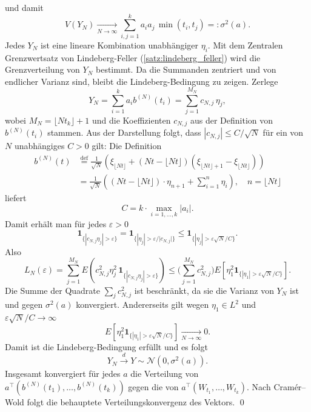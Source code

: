 \begin{satz}
$$$$
und damit
$$
V(Y_N)\xrightarrow[N\to\infty]{}\sum_{i,j=1}^k a_i a_j\,\min(t_i,t_j)=:\sigma^2(a).
$$
Jedes $Y_N$ ist eine lineare Kombination unabhängiger $\eta_i$. Mit dem Zentralen Grenzwertsatz von Lindeberg-Feller (\ref{satz:lindeberg_feller}) wird die Grenzverteilung von $Y_N$ bestimmt.
Da die Summanden zentriert und von endlicher Varianz sind, bleibt die Lindeberg-Bedingung zu zeigen. Zerlege
$$
Y_N=\sum_{i=1}^k a_i b^{(N)}(t_i)=\sum_{j=1}^{M_N} c_{N,j}\,\eta_j,
$$
wobei $M_N=\lfloor Nt_k\rfloor+1$ und die Koeffizienten $c_{N,j}$ aus der Definition von $b^{(N)}(t_i)$ stammen.
Aus der Darstellung folgt, dass $|c_{N,j}|\le C/\sqrt N$ für ein von $N$ unabhängiges $C>0$ gilt: Die Definition
$$
\begin{aligned}
b^{(N)}(t) &\overset{\mathrm{def}}= \frac{1}{\sqrt{N}} \left ( \xi_{\lfloor Nt \rfloor} + (Nt - \lfloor Nt \rfloor)(\xi_{\lfloor Nt \rfloor + 1} - \xi_{\lfloor Nt \rfloor}) \right )
\\ &= \frac{1}{\sqrt{N}} \left ((Nt - \lfloor Nt \rfloor) \cdot \eta_{n+1} + \sum_{i=1}^n \eta_i \right ),\quad n = \lfloor Nt \rfloor
\end{aligned}
$$
liefert
$$
C = k \cdot \max_{i=1, \dots, k} \vert a_i \vert.
$$
Damit erhält man für jedes $\varepsilon>0$
$$
\mathbf 1_{\{|c_{N,j}\eta_j|>\varepsilon\}}
= \mathbf 1_{\{|\eta_j|>\varepsilon / \vert c_{N,j} \vert \}}
\le \mathbf 1_{\{|\eta_j|>\varepsilon\sqrt N/C\}}.
$$
Also
$$
L_N(\varepsilon) = \sum_{j=1}^{M_N} E \left (c_{N,j}^2\eta_j^2\,\mathbf 1_{\{|c_{N,j}\eta_j|>\varepsilon\}} \right )
\le \Big(\sum_{j=1}^{M_N} c_{N,j}^2 \Big) E \left [ \eta_1^2\mathbf 1_{\{|\eta_1|>\varepsilon\sqrt N/C\}} \right ].
$$
Die Summe der Quadrate $\sum_j c_{N,j}^2$ ist beschränkt, da sie die Varianz von $Y_N$ ist und gegen
$\sigma^2(a)$ konvergiert. Andererseits gilt wegen $\eta_1\in L^2$ und $\varepsilon\sqrt N/C \to \infty$
$$
E \left [ \eta_1^2\mathbf 1_{\{|\eta_1|>\varepsilon\sqrt N/C\}} \right ] \xrightarrow[N\to\infty]{}0.
$$
Damit ist die Lindeberg-Bedingung erfüllt und es folgt
$$
Y_N \xrightarrow{d} Y \sim \mathcal N(0,\sigma^2(a)).
$$
Insgesamt konvergiert für jedes $a$ die Verteilung von $a^\top(b^{(N)}(t_1),\dots,b^{(N)}(t_k))$ gegen die von $a^\top(W_{t_1},\dots,W_{t_k})$.
Nach Cramér–Wold folgt die behauptete Verteilungskonvergenz des Vektors. \qed
\end{satz}

